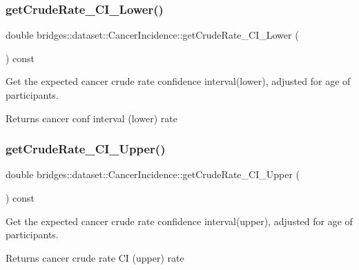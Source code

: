 \subsubsection{\texorpdfstring{getCrudeRate\_CI\_Lower()}{getCrudeRate\_CI\_Lower()}}
{\footnotesize\ttfamily double bridges\+::dataset\+::\+Cancer\+Incidence\+::get\+Crude\+Rate\+\_\+\+C\+I\+\_\+\+Lower (\begin{DoxyParamCaption}{ }\end{DoxyParamCaption}) const\hspace{0.3cm}{\ttfamily [inline]}}

Get the expected cancer crude rate confidence interval(lower), adjusted for age of participants.

\begin{DoxyReturn}{Returns}
cancer conf interval (lower) rate 
\end{DoxyReturn}
\mbox{\label{classbridges_1_1dataset_1_1_cancer_incidence_a173b07266305744cac5f853cac7a089e}} 
\subsubsection{\texorpdfstring{getCrudeRate\_CI\_Upper()}{getCrudeRate\_CI\_Upper()}}
{\footnotesize\ttfamily double bridges\+::dataset\+::\+Cancer\+Incidence\+::get\+Crude\+Rate\+\_\+\+C\+I\+\_\+\+Upper (\begin{DoxyParamCaption}{ }\end{DoxyParamCaption}) const\hspace{0.3cm}{\ttfamily [inline]}}

Get the expected cancer crude rate confidence interval(upper), adjusted for age of participants.

\begin{DoxyReturn}{Returns}
cancer crude rate CI (upper) rate 
\end{DoxyReturn}
\mbox{\label{classbridges_1_1dataset_1_1_cancer_incidence_a964d0fcc125808e457b1fd2f79cf43bf}} 
